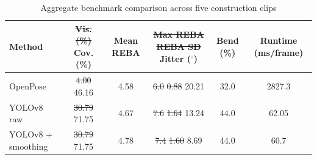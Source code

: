 \documentclass[11pt]{article}
\makeatletter
\providecommand{\DIFdeltex}[1]{{\protect\color{red}\sout{#1}}} %
\providecommand{\DIFdelFL}[1]{\DIFdel{#1}} %
\providecommand{\DIFaddbeginFL}{} %
\providecommand{\DIFaddendFL}{} %
\providecommand{\DIFdelbeginFL}{} %
\providecommand{\DIFdelendFL}{} %
\providecommand{\DIFdel}[1]{\texorpdfstring{\DIFdeltex{#1}}{}} %
\let\sout@orig\sout %
\renewcommand{\sout}[1]{\ifmmode\text{\sout@orig{\ensuremath{#1}}}\else\sout@orig{#1}\fi} %
\makeatother
\begin{document}
\begin{table}[H]
\centering
\scriptsize
\caption{Aggregate benchmark comparison across five construction clips}
\setlength{\tabcolsep}{4pt}
\renewcommand{\arraystretch}{0.95}
\DIFdelbeginFL %
\DIFdelendFL \DIFaddbeginFL \begin{tabular}{lccccc}
\DIFaddendFL \toprule
\textbf{Method} & \DIFdelbeginFL \textbf{\DIFdelFL{Vis. (\%)}} %
\DIFdelendFL \textbf{Cov. (\%)} & \textbf{Mean REBA} & \DIFdelbeginFL \textbf{\DIFdelFL{Max REBA}} %
\textbf{\DIFdelFL{REBA SD}} %
\DIFdelendFL \textbf{Jitter ($^\circ$)} & \textbf{Bend (\%)} & \textbf{Runtime (ms/frame)} \\
\midrule
OpenPose & \DIFdelbeginFL \DIFdelFL{4.00 }%
\DIFdelendFL 46.16 & 4.58 & \DIFdelbeginFL \DIFdelFL{6.0 }%
\DIFdelFL{0.88 }%
\DIFdelendFL 20.21 & 32.0 & 2827.3 \\
YOLOv8 raw & \DIFdelbeginFL \DIFdelFL{30.79 }%
\DIFdelendFL 71.75 & 4.67 & \DIFdelbeginFL \DIFdelFL{7.6 }%
\DIFdelFL{1.64 }%
\DIFdelendFL 13.24 & 44.0 & 62.05 \\
YOLOv8 + smoothing & \DIFdelbeginFL \DIFdelFL{30.79 }%
\DIFdelendFL 71.75 & 4.78 & \DIFdelbeginFL \DIFdelFL{7.4 }%
\DIFdelFL{1.60 }%
\DIFdelendFL 8.69 & 44.0 & 60.7 \\
\bottomrule
\end{tabular}
\label{table:benchmark_summary}
\end{table}
\end{document}
